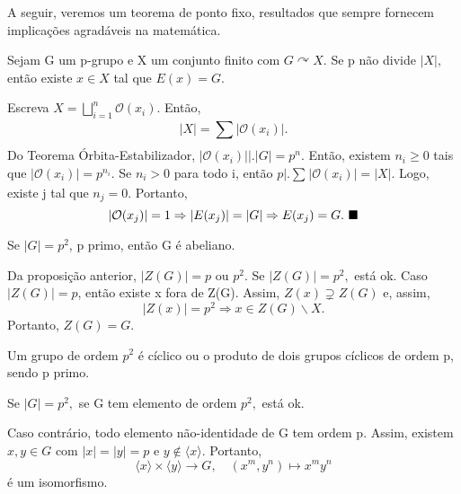 \documentclass[Algebra/algebra_notes.tex]{subfiles}
\begin{document}
A seguir, veremos um teorema de ponto fixo, resultados que sempre fornecem implicações
agradáveis na matemática.
\hypertarget{fixed_point}{
	\begin{theorem*}
		Sejam G um p-grupo e X um conjunto finito com \(G \curvearrowright X.\) Se p
		não divide \(|X|,\) então existe \(x\in X\) tal que \(E(x) = G.\)
	\end{theorem*}}
\begin{proof*}
	Escreva \(X = \bigsqcup_{i=1}^{n}{\mathcal{O}(x_{i}).}\) Então,
	\[
		|X| = \sum\limits_{}^{}|\mathcal{O}(x_{i})|.
	\]
	Do Teorema Órbita-Estabilizador, \(|\mathcal{O}(x_{i})|\biggl|\biggr. |G|= p^{n}.\)
	Então, existem \(n_{i}\geq 0\) tais que \(|\mathcal{O}(x_{i})| = p^{n_{i}}.\)
	Se \(n_{i} > 0\) para todo i, então \(p\bigl|\bigr. \sum\limits_{}^{}|\mathcal{O}(x_{i})| = |X|.\)
	Logo, existe j tal que \(n_{j}=0\). Portanto,
	\[
		|\mathcal{O}(x_{j})| = 1 \Rightarrow |E(x_{j})| = |G| \Rightarrow E(x_{j}) = G.\text{ $\blacksquare$}
	\]
\end{proof*}
\begin{prop*}
	Se \(|G| = p^{2}\), p primo, então G é abeliano.
\end{prop*}
\begin{proof*}
	Da proposição anterior, \(|Z(G)| = p\) ou \(p^{2}.\) Se \(|Z(G)|=p^{2},\) está ok.
	Caso \(|Z(G)| = p\), então existe x fora de Z(G). Assim, \(Z(x)\supsetneq{Z(G)}\) e, assim,
	\[
		|Z(x)| = p^{2} \Rightarrow x\in Z(G)\backslash X.
	\]
	Portanto, \(Z(G) = G.\) \qedsymbol
\end{proof*}
\begin{crl*}
	Um grupo de ordem \(p^{2}\) é cíclico ou o produto de dois grupos cíclicos de ordem p, sendo p primo.
\end{crl*}
\begin{proof*}
	Se \(|G| = p^{2},\) se G tem elemento de ordem \(p^{2},\) está ok.

	Caso contrário, todo elemento não-identidade de G tem ordem p. Assim, existem
	\(x, y\in G\) com \(|x|=|y| = p\) e \(y\not\in\langle x\rangle\). Portanto,
	\[
		\langle x\rangle \times\langle y\rangle\rightarrow G, \quad (x^{m}, y^{n})\mapsto x^{m}y^{n}
	\]
	é um isomorfismo. \qedsymbol
\end{proof*}
\newpage
\end{document}
